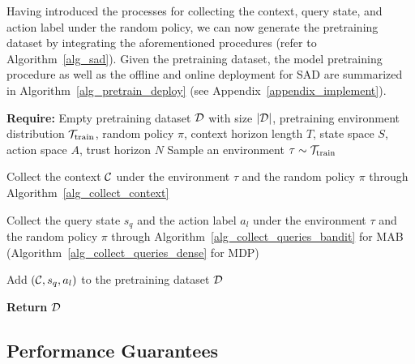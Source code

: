 Having introduced the processes for collecting the context, query state, and action label under the random policy, we can now generate the pretraining dataset by integrating the aforementioned procedures (refer to Algorithm~\ref{alg_sad}).
%
Given the pretraining dataset, the model pretraining procedure as well as the offline and online deployment for SAD are summarized in Algorithm~\ref{alg_pretrain_deploy} (see Appendix~\ref{appendix_implement}).









\begin{algorithm}[ht]
\caption{State-Action Distillation (SAD) under Random Policy}         
\label{alg_sad}
\begin{algorithmic}[1]
		\STATE \textbf{Require:} Empty pretraining dataset ${\mathcal D}$ with size $|{\mathcal D}|$, pretraining environment distribution ${\mathcal T}_{\text{train}}$, random policy $\pi$, context horizon length $T$, state space $S$, action space $A$, trust horizon $N$
            \STATE Sample an environment $\tau \sim {\ensuremath{\mathcal T}}_{\text{train}}$

            \STATE Collect the context ${\mathcal C}$ under the environment $\tau$ and the random policy $\pi$ through Algorithm~\ref{alg_collect_context}

            \STATE Collect the query state $s_q$ and the action label $a_l$ under the environment $\tau$ and the random policy $\pi$ through Algorithm~\ref{alg_collect_queries_bandit} for MAB (Algorithm~\ref{alg_collect_queries_dense} for MDP)

            \STATE Add $({\mathcal C}, s_q, a_l)$ to the pretraining dataset ${\mathcal D}$
        \ENDFOR

        \STATE \textbf{Return} ${\mathcal D}$
\end{algorithmic}
\end{algorithm}











\subsection{Performance Guarantees}



